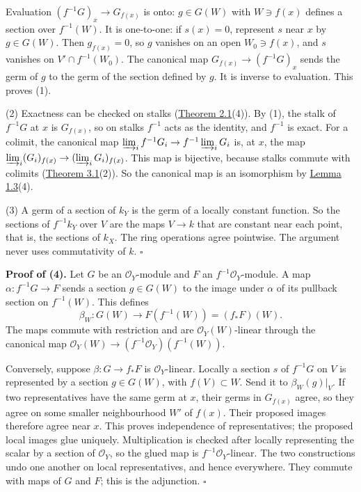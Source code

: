 \documentclass[
  english,
  11pt,
  a4paper,
]{article}
\begin{document}
Evaluation \((f^{-1}G)_x\to G_{f(x)}\) is onto: \(g\in G(W)\) with
\(W\ni f(x)\) defines a section over \(f^{-1}(W)\). It is one-to-one: if
\(s(x)=0\), represent \(s\) near \(x\) by \(g\in G(W)\). Then
\(g_{f(x)}=0\), so \(g\) vanishes on an open \(W_0\ni f(x)\), and \(s\)
vanishes on \(V'\cap f^{-1}(W_0)\). The canonical map
\(G_{f(x)}\to(f^{-1}G)_x\) sends the germ of \(g\) to the germ of the
section defined by \(g\). It is inverse to evaluation. This proves (1).

(2) Exactness can be checked on stalks
(\hyperref[sheaves-of-modules-on-a-ringed-space--2-the-abelian-category-of-module-sheaves]{Theorem
2.1}(4)). By (1), the stalk of \(f^{-1}G\) at \(x\) is \(G_{f(x)}\), so
on stalks \(f^{-1}\) acts as the identity, and \(f^{-1}\) is exact. For
a colimit, the canonical map
\(\varinjlim_if^{-1}G_i\to f^{-1}\varinjlim_iG_i\) is, at \(x\), the map
\(\varinjlim_i(G_i)_{f(x)}\to(\varinjlim_iG_i)_{f(x)}\). This map is
bijective, because stalks commute with colimits
(\hyperref[sheaves-of-modules-on-a-ringed-space--3-limits-colimits-stalks-and-sections-of-sums]{Theorem
3.1}(2)). So the canonical map is an isomorphism by
\hyperref[sheaves-of-modules-on-a-ringed-space--sheafification-and-the-stalk-test]{Lemma
1.3}(4).

(3) A germ of a section of \(k_Y\) is the germ of a locally constant
function. So the sections of \(f^{-1}k_Y\) over \(V\) are the maps
\(V\to k\) that are constant near each point, that is, the sections of
\(k_X\). The ring operations agree pointwise. The argument never uses
commutativity of \(k\). \(\square\)

\textbf{Proof of (4).} Let \(G\) be an \(\mathcal O_Y\)-module and \(F\)
an \(f^{-1}\mathcal O_Y\)-module. A map \(\alpha:f^{-1}G\to F\) sends a
section \(g\in G(W)\) to the image under \(\alpha\) of its pullback
section on \(f^{-1}(W)\). This defines
\[\beta_W:G(W)\longrightarrow F(f^{-1}(W))=(f_*F)(W).\] The maps commute
with restriction and are \(\mathcal O_Y(W)\)-linear through the
canonical map \(\mathcal O_Y(W)\to(f^{-1}\mathcal O_Y)(f^{-1}(W))\).

Conversely, suppose \(\beta:G\to f_*F\) is \(\mathcal O_Y\)-linear.
Locally a section \(s\) of \(f^{-1}G\) on \(V\) is represented by a
section \(g\in G(W)\), with \(f(V)\subset W\). Send it to
\(\beta_W(g)|_V\). If two representatives have the same germ at \(x\),
their germs in \(G_{f(x)}\) agree, so they agree on some smaller
neighbourhood \(W'\) of \(f(x)\). Their proposed images therefore agree
near \(x\). This proves independence of representatives; the proposed
local images glue uniquely. Multiplication is checked after locally
representing the scalar by a section of \(\mathcal O_Y\), so the glued
map is \(f^{-1}\mathcal O_Y\)-linear. The two constructions undo one
another on local representatives, and hence everywhere. They commute
with maps of \(G\) and \(F\); this is the adjunction. \(\square\)
\end{document}
